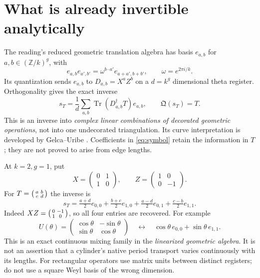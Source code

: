 \documentclass[11pt]{article}
\theoremstyle{definition}
\newcommand{\Z}{\mathbb Z}
\newcommand{\Tr}{\operatorname{Tr}}
\begin{document}
\section{What is already invertible analytically}\label{sec:symbol}
The reading's reduced geometric translation algebra has basis
$e_{a,b}$ for $a,b\in(\Z/k)^g$, with
\[
 e_{a,b}e_{a',b'}=\omega^{b\cdot a'}e_{a+a',b+b'},\qquad
 \omega=e^{2\pi i/k}.
\]
Its quantization sends $e_{a,b}$ to $D_{a,b}=X^aZ^b$ on a
$d=k^g$ dimensional theta register. Orthogonality gives the exact inverse
\begin{equation}\label{eq:symbol}
 s_T=\frac1d\sum_{a,b}\Tr(D_{a,b}^\dagger T)e_{a,b},
 \qquad \mathfrak Q(s_T)=T.
\end{equation}
This is an inverse into \emph{complex linear combinations of decorated
geometric operations}, not into one undecorated triangulation.
Its curve interpretation is developed by Gelca--Uribe \cite{gelca}.
Coefficients in \eqref{eq:symbol} retain the information in $T$; they
are not proved to arise from edge lengths.

At $k=2,g=1$, put
\[
 X=\begin{pmatrix}0&1\\1&0\end{pmatrix},\qquad
 Z=\begin{pmatrix}1&0\\0&-1\end{pmatrix}.
\]
For $T=\begin{psmallmatrix}a&b\\c&d\end{psmallmatrix}$ the inverse is
\begin{equation}\label{eq:qubit-symbol}
 s_T=\tfrac{a+d}{2}e_{0,0}
     +\tfrac{b+c}{2}e_{1,0}
     +\tfrac{a-d}{2}e_{0,1}
     +\tfrac{c-b}{2}e_{1,1}.
\end{equation}
Indeed $XZ=\begin{psmallmatrix}0&-1\\1&0\end{psmallmatrix}$, so all four
entries are recovered. For example
\[
 U(\theta)=
 \begin{pmatrix}\cos\theta&-\sin\theta\\
                 \sin\theta&\cos\theta\end{pmatrix}
 \quad\longleftrightarrow\quad
 \cos\theta\,e_{0,0}+\sin\theta\,e_{1,1}.
\]
This is an exact continuous mixing family in the \emph{linearized
geometric algebra}. It is not an assertion that a cylinder's native
period transport varies continuously with its lengths.
For rectangular operators use matrix units between distinct registers;
do not use a square Weyl basis of the wrong dimension.
\end{document}
